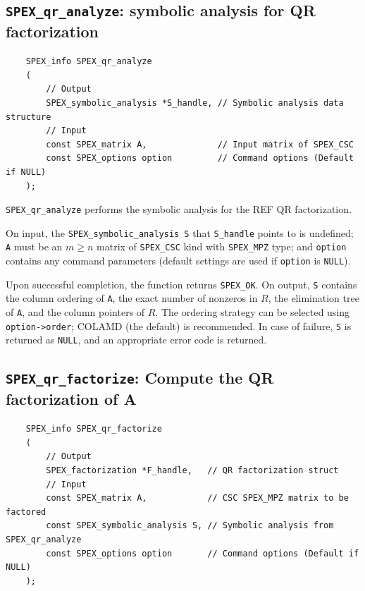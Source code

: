 \documentclass[12pt,oneside]{book}
\theoremstyle{definition}
\begin{document}
\subsection{\texttt{SPEX\_qr\_analyze}: symbolic analysis for QR factorization} \label{ss:spex_qr_analyze}
\begin{mdframed}[userdefinedwidth=\textwidth]
{\footnotesize
\begin{verbatim}
    SPEX_info SPEX_qr_analyze
    (
        // Output
        SPEX_symbolic_analysis *S_handle, // Symbolic analysis data structure 
        // Input
        const SPEX_matrix A,              // Input matrix of SPEX_CSC
        const SPEX_options option         // Command options (Default if NULL)
    );
    \end{verbatim}
} \end{mdframed}

\verb|SPEX_qr_analyze| performs the symbolic analysis for the REF QR factorization. 

On input, the \verb|SPEX_symbolic_analysis S| that \verb|S_handle| points to is undefined; \verb|A| must be an $m \ge n$ matrix of \verb|SPEX_CSC|  kind with \verb|SPEX_MPZ| type; and \verb|option| contains any command parameters (default settings are used if \verb|option| is \verb|NULL|).

Upon successful completion, the function returns \verb|SPEX_OK|. On output, \verb|S| contains the column ordering of \verb|A|, the exact number of nonzeros in $R$, the elimination tree of \verb|A|, and the column pointers of $R$. The ordering strategy can be selected using \verb|option->order|; COLAMD (the default) is recommended. In case of failure, \verb|S| is returned as \verb|NULL|, and an appropriate error code is returned. 

\subsection{\texttt{SPEX\_qr\_factorize}: Compute the QR factorization of A} \label{ss:spex_qr_factorize}
\begin{mdframed}[userdefinedwidth=\textwidth]
{\footnotesize
\begin{verbatim}
    SPEX_info SPEX_qr_factorize
    (
        // Output
        SPEX_factorization *F_handle,   // QR factorization struct
        // Input
        const SPEX_matrix A,            // CSC SPEX_MPZ matrix to be factored
        const SPEX_symbolic_analysis S, // Symbolic analysis from SPEX_qr_analyze
        const SPEX_options option       // Command options (Default if NULL)
    );
\end{verbatim}
} \end{mdframed}
\end{document}
